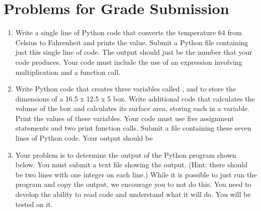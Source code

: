\documentclass[letterpaper,10pt,english]{sphinxmanual}
\begin{document}
\section{Problems for Grade Submission}
\label{\detokenize{lecture_notes/lec02_calculator_exercises/exercises:problems-for-grade-submission}}\begin{enumerate}
\item {} 
Write a single line of Python code that converts the temperature
64 from Celsius to Fahrenheit and prints the value.  Submit a Python
file containing just this single line of code.  The output should
just be the number that your code produces.  Your code must include
the use of an expression involving multiplication and a 
function call.

\item {} 
Write Python code that creates three variables called
,  and  to store the dimensions of a 16.5 x
12.5 x 5 box.  Write additional code that calculates the volume
of the box and calculates its surface area, storing each in a
variable.  Print the values of these variables.  Your code must use
five assignment statements and two print function calls.  Submit a
file containing these seven lines of Python code. Your output
should be

\end{enumerate}

%
\begin{sphinxVerbatim}[commandchars=\\\{\}]
  
  
\end{sphinxVerbatim}
\begin{enumerate}
\setcounter{enumi}{2}
\item {} 
Your problem is to determine the output of the Python program shown
below.  You must submit a text file showing the output.  (Hint:
there should be two lines with one integer on each line.)  While it
is possible to just run the program and copy the output, we
 encourage you to not do this.  You need to develop
the ability to read code and understand what it will do.  You will
be tested on it.

\end{enumerate}

%
\begin{sphinxVerbatim}[commandchars=\\\{\}]
  
  
  
          
\end{sphinxVerbatim}
\end{document}
